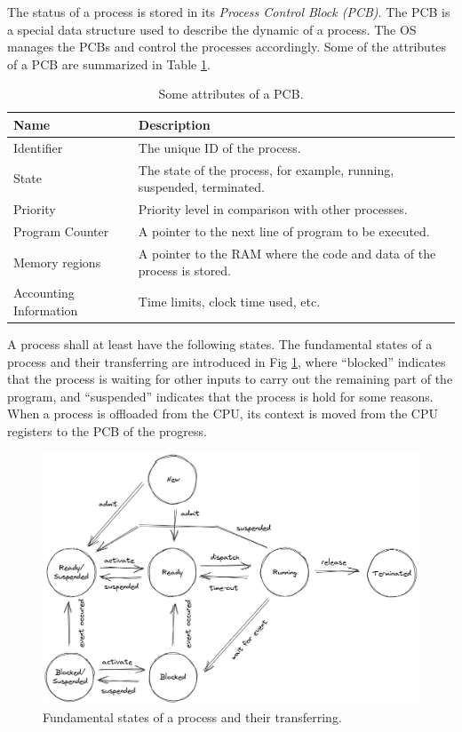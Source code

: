 The status of a process is stored in its \textit{Process Control Block (PCB)}. The PCB is a special data structure used to describe the dynamic of a process. The OS manages the PCBs and control the processes accordingly. Some of the attributes of a PCB are summarized in Table \ref{ch:pm:tab:pcbcontent}.

\begin{table}
	\centering \caption{Some attributes of a PCB.}\label{ch:pm:tab:pcbcontent}
	\begin{tabularx}{\textwidth}{lX}
		\hline
		Name & Description \\ \hline
		Identifier & The unique ID of the process.  \\ \hdashline
		State & The state of the process, for example, running, suspended, terminated.  \\ \hdashline
		Priority & Priority level in comparison with other processes. \\ \hdashline
		Program Counter & A pointer to the next line of program to be executed. \\ \hdashline
		Memory regions & A pointer to the RAM where the code and data of the process is stored. \\ \hdashline
		Accounting Information & Time limits, clock time used, etc. \\ \hline
	\end{tabularx}
\end{table}

A process shall at least have the following states. The fundamental states of a process and their transferring are introduced in Fig \ref{ch:pm:fig:processstatetransfer}, where ``blocked'' indicates that the process is waiting for other inputs to carry out the remaining part of the program, and ``suspended'' indicates that the process is hold for some reasons. When a process is offloaded from the CPU, its context is moved from the CPU registers to the PCB of the progress.

\begin{figure}
	\centering
	\includegraphics[width=350pt]{chapters/ch-process-management/figures/processstatetransfer.png}
	\caption{Fundamental states of a process and their transferring.} \label{ch:pm:fig:processstatetransfer}
\end{figure}

